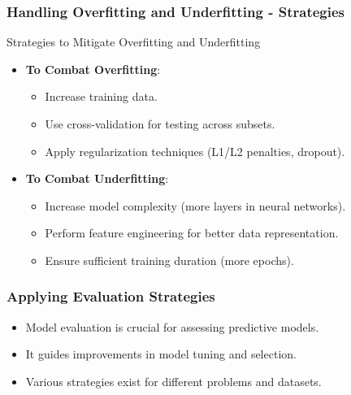 \documentclass[aspectratio=169]{beamer}
\begin{document}
\begin{frame}[fragile]
    \frametitle{Handling Overfitting and Underfitting - Strategies}
    \begin{block}{Strategies to Mitigate Overfitting and Underfitting}
        \begin{itemize}
            \item \textbf{To Combat Overfitting}:
            \begin{itemize}
                \item Increase training data.
                \item Use cross-validation for testing across subsets.
                \item Apply regularization techniques (L1/L2 penalties, dropout).
            \end{itemize}
            \item \textbf{To Combat Underfitting}:
            \begin{itemize}
                \item Increase model complexity (more layers in neural networks).
                \item Perform feature engineering for better data representation.
                \item Ensure sufficient training duration (more epochs).
            \end{itemize}
        \end{itemize}
    \end{block}
\end{frame}

\begin{frame}
  \frametitle{Applying Evaluation Strategies}
  \begin{itemize}
    \item Model evaluation is crucial for assessing predictive models.
    \item It guides improvements in model tuning and selection.
    \item Various strategies exist for different problems and datasets.
  \end{itemize}
\end{frame}
\end{document}
